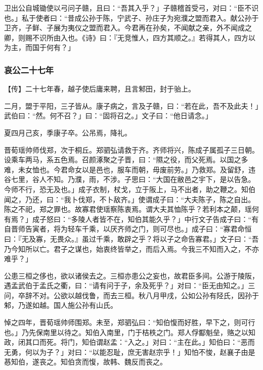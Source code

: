 \documentclass[]{article}
\begin{document}
卫出公自城锄使以弓问子赣，且曰：``吾其入乎？」子赣稽首受弓，对曰：``臣不识也。」私于使者曰：``昔成公孙于陈，宁武子、孙庄子为宛濮之盟而君入。献公孙于卫齐，子鲜、子展为夷仪之盟而君入。今君再在孙矣，不闻献之亲，外不闻成之卿，则赐不识所由入也。《诗》曰：『无竞惟人，四方其顺之。』若得其人，四方以为主，而国于何有？」

\hypertarget{header-n3299}{%
\subsubsection{哀公二十七年}\label{header-n3299}}

【传】二十七年春，越子使后庸来聘，且言邾田，封于骀上。

二月，盟于平阳，三子皆从。康子病之，言及子赣，曰：``若在此，吾不及此夫！」武伯曰：``然。何不召？」曰：``固将召之。」文子曰：``他日请念。」

夏四月己亥，季康子卒。公吊焉，降礼。

晋荀瑶帅师伐郑，次于桐丘。郑驷弘请救于齐。齐师将兴，陈成子属孤子三日朝。设乘车两马，系五色焉。召颜涿聚之子晋，曰：``隰之役，而父死焉。以国之多难，未女恤也。今君命女以是邑也，服车而朝，毋废前劳。」乃救郑。及留舒，违谷七里，谷人不知。乃濮，雨，不涉。子思曰：``大国在敝邑之宇下，是以告急。今师不行，恐无及也。」成子衣制，杖戈，立于阪上，马不出者，助之鞭之。知伯闻之，乃还，曰：``我卜伐郑，不卜敌齐。」使谓成子曰：``大夫陈子，陈之自出。陈之不祀，郑之罪也。故寡君使瑶察陈衷焉。谓大夫其恤陈乎？若利本之颠，瑶何有焉？」成子怒曰：``多陵人者皆不在，知伯其能久乎？」中行文子告成子曰：``有自晋师告寅者，将为轻车千乘，以厌齐师之门，则可尽也。」成子曰：``寡君命恒曰：『无及寡，无畏众。』虽过千乘，敢辟之乎？将以子之命告寡君。」文子曰：``吾乃今知所以亡。君子之谋也，始衷终皆举之，而后入焉。今我三不知而入之，不亦难乎？」

公患三桓之侈也，欲以诸侯去之。三桓亦患公之妄也，故君臣多间。公游于陵阪，遇孟武伯于孟氏之衢，曰：``请有问于子，余及死乎？」对曰：``臣无由知之。」三问，卒辞不对。公欲以越伐鲁，而去三桓。秋八月甲戌，公如公孙有陉氏，因孙于邾，乃遂如越。国人施公孙有山氏。

悼之四年，晋荀瑶帅师围郑。未至，郑驷弘曰：``知伯愎而好胜，早下之，则可行也。」乃先保南里以待之。知伯入南里，门于桔柣之门。郑人俘酅魁垒，赂之以知政，闭其口而死。将门，知伯谓赵孟：``入之。」对曰：``主在此。」知伯曰：``恶而无勇，何以为子？」对曰：``以能忍耻，庶无害赵宗乎！」知怕不悛，赵襄子由是惎知伯，遂丧之。知伯贪而愎，故韩、魏反而丧之。
\end{document}
